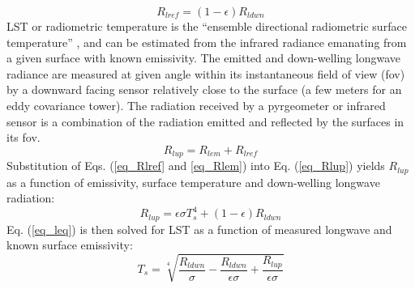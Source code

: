 \documentclass[fleqn,10pt]{wlscirep}
\begin{document}
\begin{equation}\label{eq_Rlref}
R_{lref} = (1 - \epsilon) R_{ldwn} 
\end{equation}
LST or radiometric temperature is the “ensemble directional radiometric surface temperature” \cite{norman1995terminology}, and can be estimated from the infrared radiance emanating from a given surface with known emissivity\cite{kustas2007utility}. The emitted and down-welling longwave radiance are measured at given angle within its instantaneous field of view (fov) by a downward facing sensor relatively close to the surface (a few meters for an eddy covariance tower). The radiation received by a pyrgeometer or infrared sensor is a combination of the radiation emitted and reflected by the surfaces in its fov. 
\begin{equation}\label{eq_Rlup}
R_{lup} = R_{lem} + R_{lref}
\end{equation}
Substitution of Eqs. (\ref{eq_Rlref} and \ref{eq_Rlem}) into Eq. (\ref{eq_Rlup}) yields $R_{lup}$ as a function of emissivity, surface temperature and down-welling longwave radiation:
\begin{equation}\label{eq_leq}
R_{lup}= \epsilon \sigma T_{s}^{4} + (1- \epsilon)R_{ldwn}
\end{equation}
Eq. (\ref{eq_leq}) is then solved for LST as a function of measured longwave and known surface emissivity:
\begin{equation}\label{eq_Tleq}
T_{s} = \sqrt[4]{\frac{R_{ldwn}}{\sigma} - \frac{R_{ldwn}}{\epsilon \sigma} + \frac{R_{lup}}{\epsilon \sigma}}
\end{equation}
\end{document}
